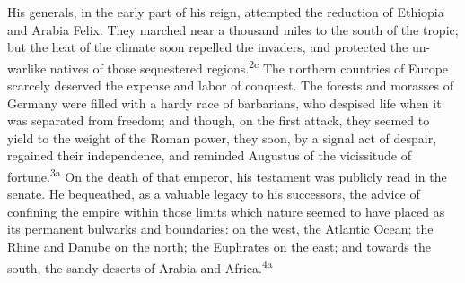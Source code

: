 
His generals, in the early part of his reign, attempted the
reduction of Ethiopia and Arabia Felix. They marched near a
thousand miles to the south of the tropic; but the heat of the
climate soon repelled the invaders, and protected the un-warlike
natives of those sequestered regions.\textsuperscript{2c} The northern countries
of Europe scarcely deserved the expense and labor of conquest.
The forests and morasses of Germany were filled with a hardy race
of barbarians, who despised life when it was separated from
freedom; and though, on the first attack, they seemed to yield to
the weight of the Roman power, they soon, by a signal act of
despair, regained their independence, and reminded Augustus of
the vicissitude of fortune.\textsuperscript{3a} On the death of that emperor, his
testament was publicly read in the senate. He bequeathed, as a
valuable legacy to his successors, the advice of confining the
empire within those limits which nature seemed to have placed as
its permanent bulwarks and boundaries: on the west, the Atlantic
Ocean; the Rhine and Danube on the north; the Euphrates on the
east; and towards the south, the sandy deserts of Arabia and
Africa.\textsuperscript{4a}

